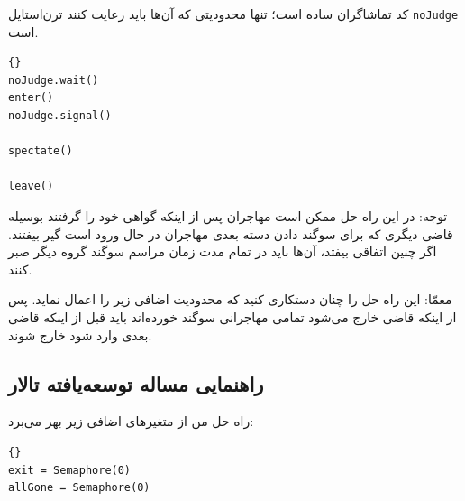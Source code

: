 \documentclass{book}
\newcommand{\clearemptydoublepage}{\newpage\cleardoublepage}
\begin{document}
    کد تماشاگران ساده است؛ تنها محدودیتی که  آن‌ها باید رعایت کنند ترن‌استایل  {\tt noJudge} است.

\begin{latin}
\begin{lstlisting}[title=\rl{راهنمایی مساله تالار \lr{Faneuil} (تماشاگر)}]{}
noJudge.wait()
enter()
noJudge.signal()

spectate()

leave()
\end{lstlisting}
\end{latin}

    توجه: در این راه حل ممکن است مهاجران پس از اینکه گواهی خود را گرفتند بوسیله قاضی‌ دیگری که برای سوگند دادن دسته بعدی 
    مهاجران در حال ورود است گیر بیفتند. اگر چنین اتفاقی بیفتد، آن‌ها باید در تمام مدت زمان مراسم سوگند گروه دیگر صبر کنند. 

    معمّا: این راه حل را چنان دستکاری کنید که محدودیت اضافی زیر را اعمال نماید. پس از اینکه قاضی خارج می‌شود تمامی مهاجرانی سوگند خورده‌اند 
    باید قبل از اینکه قاضی بعدی وارد شود خارج شوند. 


\clearemptydoublepage
\subsection{راهنمایی مساله توسعه‌یافته تالار }

    راه حل من از متغیرهای اضافی زیر بهر می‌برد:‌

\begin{latin}
\begin{lstlisting}[title=\rl{راهنمایی مساله تالار \lr{Faneuil}}]{}
exit = Semaphore(0)
allGone = Semaphore(0)
\end{lstlisting}
\end{latin}
\end{document}
